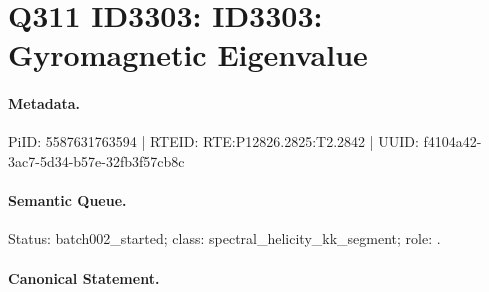 \section*{Q311 ID3303: ID3303: Gyromagnetic Eigenvalue}
\paragraph{Metadata.}
PiID: 5587631763594 | RTEID: RTE:P12826.2825:T2.2842 | UUID: f4104a42-3ac7-5d34-b57e-32fb3f57cb8c

\paragraph{Semantic Queue.}
Status: batch002\_started; class: spectral\_helicity\_kk\_segment; role: .

\paragraph{Canonical Statement.}
